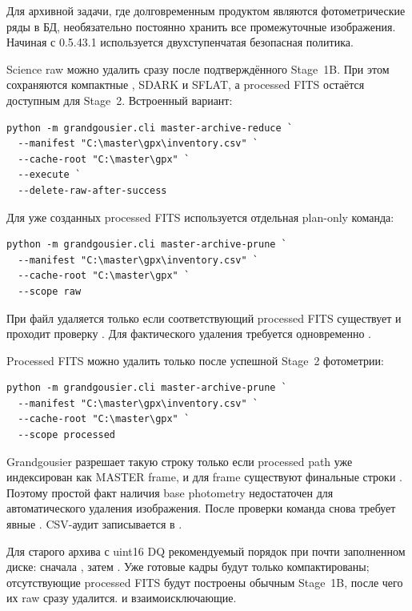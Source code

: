 Для архивной задачи, где долговременным продуктом являются фотометрические ряды в БД, необязательно постоянно хранить все промежуточные изображения. Начиная с 0.5.43.1 используется двухступенчатая безопасная политика.

Science raw можно удалить сразу после подтверждённого Stage~1B. При этом сохраняются компактные , SDARK и SFLAT, а processed FITS остаётся доступным для Stage~2. Встроенный вариант:

\begin{lstlisting}
python -m grandgousier.cli master-archive-reduce `
  --manifest "C:\master\gpx\inventory.csv" `
  --cache-root "C:\master\gpx" `
  --execute `
  --delete-raw-after-success
\end{lstlisting}

Для уже созданных processed FITS используется отдельная plan-only команда:

\begin{lstlisting}
python -m grandgousier.cli master-archive-prune `
  --manifest "C:\master\gpx\inventory.csv" `
  --cache-root "C:\master\gpx" `
  --scope raw
\end{lstlisting}

При  файл удаляется только если соответствующий processed FITS существует и проходит проверку . Для фактического удаления требуется одновременно .

Processed FITS можно удалить только после успешной Stage~2 фотометрии:

\begin{lstlisting}
python -m grandgousier.cli master-archive-prune `
  --manifest "C:\master\gpx\inventory.csv" `
  --cache-root "C:\master\gpx" `
  --scope processed
\end{lstlisting}

Grandgousier разрешает такую строку только если processed path уже индексирован как MASTER frame,  и для frame существуют финальные строки . Поэтому простой факт наличия base photometry недостаточен для автоматического удаления изображения. После проверки команда снова требует явные . CSV-аудит записывается в .

Для старого архива с uint16 DQ рекомендуемый порядок при почти заполненном диске: сначала , затем . Уже готовые кадры будут только компактированы; отсутствующие processed FITS будут построены обычным Stage~1B, после чего их raw сразу удалится.  и  взаимоисключающие.


